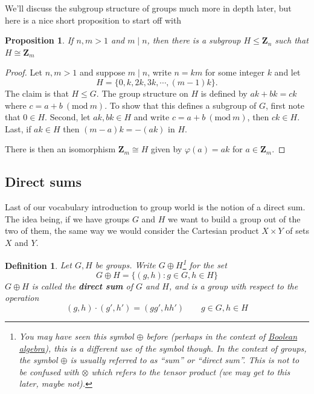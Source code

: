 \documentclass[12pt]{article}
\numberwithin{equation}{subsection}
\newtheorem{prop}[subsection]{Proposition}
\newtheorem{defn}[subsection]{Definition}
\theoremstyle{note}
\newcommand{\Mod}[1]{\ (\mathrm{mod}\ #1)}
\begin{document}
We'll discuss the subgroup structure of groups much more in depth later, but here is a nice short proposition to start off with
\begin{prop}
	If $n,m>1$ and $m\mid n$, then there is a subgroup $H\leq \mathbf{Z}_n$ such that $H\cong \mathbf{Z}_m$
\end{prop}

\begin{proof}
	Let $n,m>1$ and suppose $m\mid n$, write $n=km$ for some integer $k$ and let \[H=\{0,k,2k,3k,\cdots,(m-1)k\}.\] The claim is that $H\leq G$. The group structure on $H$ is defined by $ak+bk= ck$ where $c=a+b\Mod{m}$. To show that this defines a subgroup of $G$, first note that $0\in H$. Second, let $ak,bk\in H$ and write $c=a+b\Mod{m}$, then $ck\in H$. Last, if $ak\in H$ then $(m-a)k=-(ak)$ in $H$. 
	
	There is then an isomorphism $\mathbf{Z}_m\cong H$ given by $\varphi(a)=ak$ for $a\in \mathbf{Z}_m$.
\end{proof}

\subsection{Direct sums}
Last of our vocabulary introduction to group world is the notion of a direct sum. The idea being, if we have groups $G$ and $H$ we want to build a group out of the two of them, the same way we would consider the Cartesian product $X\times Y$ of sets $X$ and $Y$.

\begin{defn}
	Let $G,H$ be groups. Write $G\oplus H$\footnote{You may have seen this symbol $\oplus$ before (perhaps in the context of \href{https://en.wikipedia.org/wiki/Boolean_algebra\#Secondary_operations}{Boolean algebra}), this is a different use of the symbol though. In the context of groups, the symbol $\oplus$ is usually referred to as ``sum'' or ``direct sum''. This is not to be confused with $\otimes$ which refers to the tensor product (we may get to this later, maybe not). } for the set \begin{equation}  G\oplus H =\{ (g,h) : g\in G, h\in H\} \end{equation} $G\oplus H$ is called the \textbf{direct sum} of $G$ and $H$, and is a group with respect to the operation \[ (g,h)\cdot (g',h')=(gg',hh') \qquad g\in G, h\in H\]
\end{defn}
\end{document}
